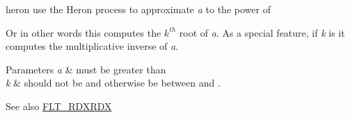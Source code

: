 \begin{DoxyDocu}{heron}
\label{heron__k_8h_aed415be19d753a5bbc83160df70aff98_aed415be19d753a5bbc83160df70aff98}
use the Heron process to approximate {\itshape a} to the power of 

Or in other words this computes the $k^{th}$ root of {\itshape a}. As a special feature, if {\itshape k} is  it computes the multiplicative inverse of {\itshape a}.


\begin{DoxyParams}{Parameters}
{\em a} & must be greater than  \\
\hline
{\em k} & should not be  and otherwise be between  and .\\
\hline
\end{DoxyParams}
\begin{DoxySeeAlso}{See also}
\hyperlink{heron__k_8h_abef2fed0bd8f17564cece90375039a16_abef2fed0bd8f17564cece90375039a16}{FLT\_RDXRDX}
\end{DoxySeeAlso}


\end{DoxyDocu}
